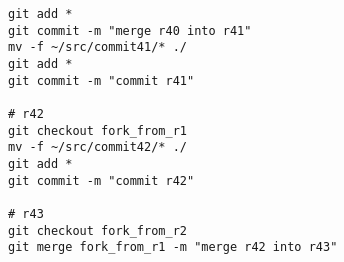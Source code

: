 
\tiny
\begin{verbatim}
git add *
git commit -m "merge r40 into r41"
mv -f ~/src/commit41/* ./
git add *
git commit -m "commit r41"

# r42
git checkout fork_from_r1
mv -f ~/src/commit42/* ./
git add *
git commit -m "commit r42"

# r43
git checkout fork_from_r2
git merge fork_from_r1 -m "merge r42 into r43"
\end{verbatim}
\normalsize